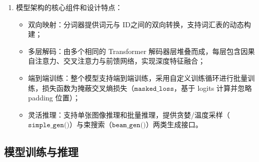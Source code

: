 \begin{enumerate}[label={（\arabic*）}, leftmargin=2em, labelsep=0.5em, itemsep=0pt]
\begin{enumerate}[label={（\alph*）}, leftmargin=2em, labelsep=0.5em, itemsep=0pt]
            \begin{itemize}
                \item 初始标记：设置生成起始标记，形状为$[1, 1]$，包含起始词元 ID；
                \item 序列扩展：将新生成的词元拼接到当前序列末尾，实现序列的逐步增长；
                \item 结束检测：检测生成结束条件，当生成结束标记时跳出循环；
                \item 结果转换：将词元 ID序列转换回可读文本：先去除起始标记，仅当序列确实以$\texttt{[END]}$结尾时才去除末位词元，避免在达到最大长度仍未生成$\texttt{[END]}$时误删最后一个有效词元；
                \item 文本拼接：将词元序列以空格连接为完整的 LaTeX 字符串；
                \item 推理模式：生成全程在 $\texttt{torch.no\_grad()}$ 与评估模式（关闭 Dropout）下进行，结束后恢复原训练状态。
            \end{itemize}
            \item 模型架构的核心组件和设计特点：
            \begin{itemize}
                \item 双向映射：分词器提供词元与 ID之间的双向转换，支持词汇表的动态构建；
                \item 多层解码：由多个相同的 Transformer 解码器层堆叠而成，每层包含因果自注意力、交叉注意力与前馈网络，实现深度特征融合；
                \item 端到端训练：整个模型支持端到端训练，采用自定义训练循环进行批量训练，损失函数为掩蔽交叉熵损失（$\texttt{masked\_loss}$，基于 logits 计算并忽略 padding 位置）；
                \item 灵活推理：支持单张图像推理和批量推理，提供贪婪/温度采样（$\texttt{simple\_gen()}$）与束搜索（$\texttt{beam\_gen()}$）两类生成接口。
            \end{itemize}
        \end{enumerate}
\end{enumerate}

\subsection{模型训练与推理}
